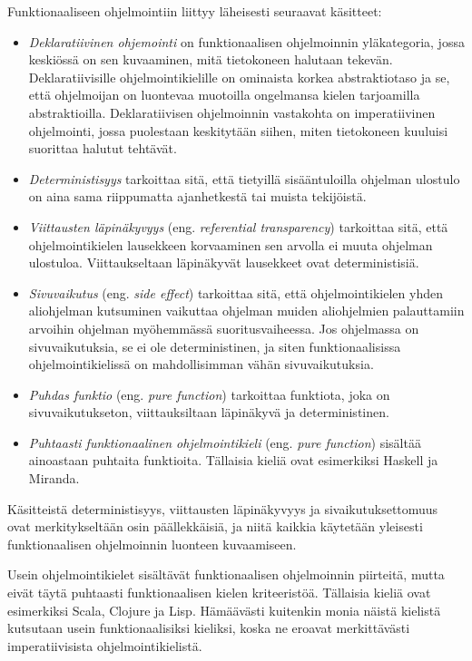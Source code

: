 Funktionaaliseen ohjelmointiin liittyy läheisesti seuraavat käsitteet:
\begin{itemize}
	\item \textit{Deklaratiivinen ohjemointi} on funktionaalisen ohjelmoinnin yläkategoria, jossa keskiössä on sen kuvaaminen, mitä tietokoneen halutaan tekevän. Deklaratiivisille ohjelmointikielille on ominaista korkea abstraktiotaso ja se, että ohjelmoijan on luontevaa muotoilla ongelmansa kielen tarjoamilla abstraktioilla. Deklaratiivisen ohjelmoinnin vastakohta on imperatiivinen ohjelmointi, jossa puolestaan keskitytään siihen, miten tietokoneen kuuluisi suorittaa halutut tehtävät.

	\item \textit{Deterministisyys} tarkoittaa sitä, että tietyillä sisääntuloilla ohjelman ulostulo on aina sama riippumatta ajanhetkestä tai muista tekijöistä.

	\item \textit{Viittausten läpinäkyvyys} (eng. \textit{referential transparency}) tarkoittaa sitä, että ohjelmointikielen lausekkeen korvaaminen sen arvolla ei muuta ohjelman ulostuloa. Viittaukseltaan läpinäkyvät lausekkeet ovat deterministisiä.

	\item \textit{Sivuvaikutus} (eng. \textit{side effect}) tarkoittaa sitä, että ohjelmointikielen yhden aliohjelman kutsuminen vaikuttaa ohjelman muiden aliohjelmien palauttamiin arvoihin ohjelman myöhemmässä suoritusvaiheessa. Jos ohjelmassa on sivuvaikutuksia, se ei ole deterministinen, ja siten funktionaalisissa ohjelmointikielissä on mahdollisimman vähän sivuvaikutuksia.

	\item \textit{Puhdas funktio} (eng. \textit{pure function}) tarkoittaa funktiota, joka on sivuvaikutukseton, viittauksiltaan läpinäkyvä ja deterministinen.

	\item \textit{Puhtaasti funktionaalinen ohjelmointikieli} (eng. \textit{pure function}) sisältää ainoastaan puhtaita funktioita. Tällaisia kieliä ovat esimerkiksi Haskell ja Miranda.
\end{itemize}

Käsitteistä deterministisyys, viittausten läpinäkyvyys ja sivaikutuksettomuus ovat merkitykseltään osin päällekkäisiä, ja niitä kaikkia käytetään yleisesti funktionaalisen ohjelmoinnin luonteen kuvaamiseen.

Usein ohjelmointikielet sisältävät funktionaalisen ohjelmoinnin piirteitä, mutta eivät täytä puhtaasti funktionaalisen kielen kriteeristöä. Tällaisia kieliä ovat esimerkiksi Scala, Clojure ja Lisp. Hämäävästi kuitenkin monia näistä kielistä kutsutaan usein funktionaalisiksi kieliksi, koska ne eroavat merkittävästi imperatiivisista ohjelmointikielistä.

